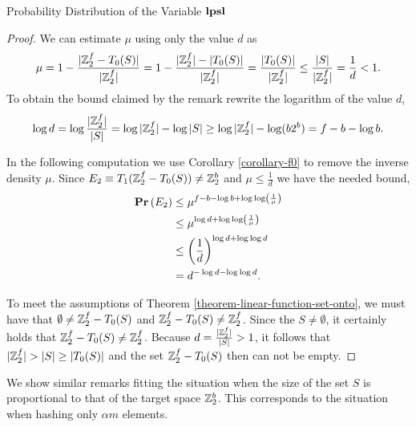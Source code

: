 \begin{section}{Probability Distribution of the Variable \texorpdfstring{$\mathbf{lpsl}$}{lpsl}}
\begin{proof}
We can estimate $\mu$ using only the value $d$ as
\[
	\mu = 1 - \frac{|\mathbb{Z}_{2}^{f} - T_0(S)|}{|\mathbb{Z}_{2}^{f}|} = 1 - \frac{|\mathbb{Z}_{2}^{f}| - |T_0(S)|}{|\mathbb{Z}_{2}^{f}|} = \frac{|T_0(S)|}{|\mathbb{Z}_{2}^{f}|} \leq \frac{|S|}{|\mathbb{Z}_{2}^{f}|} = \frac{1}{d} < 1 \text{.}
\]
To obtain the bound claimed by the remark rewrite the logarithm of the value $d$,
\[
	\log d = \log \frac{|\mathbb{Z}_{2}^{f}|}{|S|} = \log |\mathbb{Z}_{2}^{f}| - \log |S| \geq \log |\mathbb{Z}_{2}^{f}| - \log (b 2 ^ b) = f - b - \log b \text{.}
\]

In the following computation we use Corollary \ref{corollary-f0} to remove the inverse density $\mu$. Since $E_2 \equiv T_1(\mathbb{Z}_{2}^{f} - T_0(S)) \neq \mathbb{Z}_{2}^{b}$ and $\mu \leq \frac{1}{d}$ we have the needed bound,
\[
\begin{split}
\mathbf{Pr}\left(E_2\right)
	& \leq \mu^{f - b - \log b + \log \log \left(\frac{1}{\mu}\right)} \\
	& \leq \mu ^ {\log d + \log \log \left(\frac{1}{\mu}\right)} \\
	& \leq \left(\frac{1}{d}\right) ^ {\log d + \log \log d} \\
	& = d ^ {-\log d - \log \log d} \text{.} \\
\end{split}
\]

To meet the assumptions of Theorem \ref{theorem-linear-function-set-onto}, we must have that $\emptyset \neq \mathbb{Z}_{2}^{f} - T_0(S)$ and $\mathbb{Z}_{2}^{f} - T_0(S) \neq \mathbb{Z}_{2}^{f}$. Since the $S \neq \emptyset$, it certainly holds that $\mathbb{Z}_{2}^{f} - T_0(S) \neq \mathbb{Z}_{2}^{f}$. Because $d = \frac{|\mathbb{Z}_{2}^{f}|}{|S|} > 1$, it follows that $|\mathbb{Z}_{2}^{f}| > |S| \geq |T_0(S)|$ and the set $\mathbb{Z}_{2}^{f} - T_0(S)$ then can not be empty.
\end{proof}

We show similar remarks fitting the situation when the size of the set $S$ is proportional to that of the target space $\mathbb{Z}_{2}^{b}$. This corresponds to the situation when hashing only $\alpha m$ elements.


\end{section}
